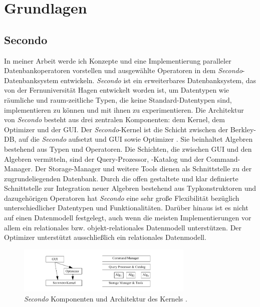 \documentclass[a4paper,12pt,twoside]{article}
\newcommand{\Fb}[1]{\textit{#1}} %
\begin{document}
\section{Grundlagen}

\subsection{Secondo}

In meiner Arbeit werde ich Konzepte und eine Implementierung paralleler Datenbankoperatoren vorstellen und ausgewählte Operatoren in dem \Fb{Secondo}-Datenbanksystem entwickeln. \Fb{Secondo} \parencite{Gueting2010} ist ein erweiterbares Datenbanksystem, das von der Fernuniversität Hagen entwickelt worden ist, um Datentypen wie räumliche und raum-zeitliche Typen, die keine Standard-Datentypen sind, implementieren zu können und mit ihnen zu experimentieren. Die Architektur von \Fb{Secondo} besteht aus drei zentralen Komponenten: dem Kernel, dem Optimizer und der GUI. Der \Fb{Secondo}-Kernel ist die Schicht zwischen der Berkley-DB, auf die \Fb{Secondo} aufsetzt und GUI sowie Optimizer \parencite{Gueting2017}. Sie beinhaltet Algebren bestehend aus Typen und Operatoren. Die Schichten, die zwischen GUI und den Algebren vermitteln, sind der Query-Prozessor, -Katalog und der Command-Manager. Der Storage-Manager und weitere Tools dienen als Schnittstelle zu der zugrundeliegenden Datenbank. Durch die offen gestaltete und klar definierte Schnittstelle zur Integration neuer Algebren bestehend aus Typkonstruktoren und dazugehörigen Operatoren hat \Fb{Secondo} eine sehr große Flexibilität bezüglich unterschiedlicher Datentypen und Funktionalitäten. Darüber hinaus ist es nicht auf einen Datenmodell festgelegt, auch wenn die meisten Implementierungen vor allem ein relationales bzw. objekt-relationales Datenmodell unterstützen. Der Optimizer unterstützt ausschließlich ein relationales Datenmodell. 

\begin{figure}
	\centering
	\includegraphics[width=0.75\textwidth]{Bilder/secondo.png}
	\caption{\Fb{Secondo} Komponenten und Architektur des Kernels \parencite{Gueting2010}.}
	\label{img:secondo}
\end{figure}
\end{document}
